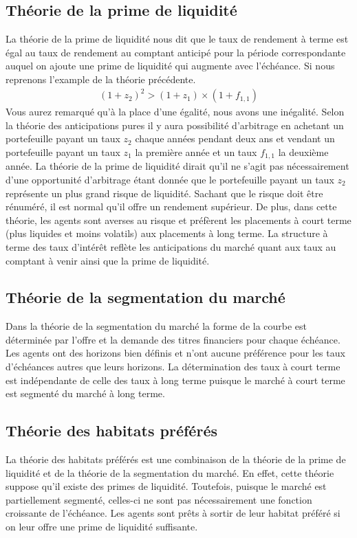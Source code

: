 \documentclass[12pt]{article}
\begin{document}
\subsection{Théorie de la prime de liquidité}
La théorie de la prime de liquidité nous dit que le taux de rendement à terme est égal au taux de rendement au comptant anticipé pour la période correspondante auquel on ajoute une prime de liquidité qui augmente avec l’échéance.  Si nous reprenons l'example de la théorie précédente.
\begin{align*}
(1+z_2)^2>(1+z_1) \times (1+f_{1,1})
\end{align*}
Vous aurez remarqué qu'à la place d'une égalité, nous avons une inégalité.  Selon la théorie des anticipations pures  il y aura possibilité d'arbitrage en achetant un portefeuille payant un taux $z_2$ chaque années pendant deux ans et vendant un portefeuille payant un taux $z_1$ la première année et un taux $f_{1,1}$ la deuxième année.  La théorie de la prime de liquidité dirait qu'il ne s'agit pas nécessairement d'une opportunité d'arbitrage étant donnée que le portefeuille payant un taux $z_2$ représente un plus grand risque de liquidité.  Sachant que le risque doit être rénuméré,  il est normal qu'il offre un rendement supérieur.  De plus,  dans cette théorie,  les agents sont averses au risque et préfèrent les placements à court terme (plus liquides et moins volatils) aux placements à long terme.  La structure à terme des taux d’intérêt reflète les anticipations du marché quant aux taux au comptant à venir ainsi que la prime de liquidité.

\subsection{Théorie de la segmentation du marché}
Dans la théorie de la segmentation du marché la forme de la courbe est déterminée par l’offre et la demande des titres financiers pour chaque échéance.  Les agents ont des horizons bien définis et n’ont aucune préférence pour les taux d’échéances autres que leurs horizons.  La détermination des taux à court terme est indépendante de celle des taux à long terme puisque le marché à court terme est segmenté du marché à long terme.
\subsection{Théorie des habitats préférés}
La théorie des habitats préférés est une combinaison de la théorie de la prime de liquidité et de la théorie de la segmentation du marché.  En effet,  cette théorie suppose qu'il existe des primes de liquidité.  Toutefois,  puisque le marché est partiellement segmenté,  celles-ci ne sont pas nécessairement une fonction croissante de l’échéance.  Les agents sont prêts à sortir de leur habitat préféré si on leur offre une prime de liquidité suffisante.
\end{document}
